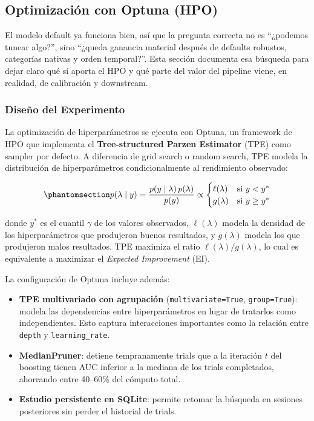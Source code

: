\documentclass[
  spanish,
  11pt,
  letterpaper,
]{scrbook}
\providecommand{\tightlist}{%
  \setlength{\itemsep}{0pt}\setlength{\parskip}{0pt}}
\theoremstyle{plain}
\theoremstyle{remark}
\begin{document}
\subsection{Optimización con Optuna (HPO)}\label{sec-optuna-hpo}

El modelo default ya funciona bien, así que la pregunta correcta no es
``¿podemos tunear algo?'', sino ``¿queda ganancia material después de
defaults robustos, categorías nativas y orden temporal?''. Esta sección
documenta esa búsqueda para dejar claro qué sí aporta el HPO y qué parte
del valor del pipeline viene, en realidad, de calibración y downstream.

\subsubsection{Diseño del Experimento}\label{diseuxf1o-del-experimento}

La optimización de hiperparámetros se ejecuta con Optuna, un framework
de HPO que implementa el \textbf{Tree-structured Parzen Estimator} (TPE)
como sampler por defecto. A diferencia de grid search o random search,
TPE modela la distribución de hiperparámetros condicionalmente al
rendimiento observado:

\begin{equation}\protect\phantomsection\label{eq-tpe}{
p(\lambda \mid y) = \frac{p(y \mid \lambda) \, p(\lambda)}{p(y)} \propto \begin{cases} \ell(\lambda) & \text{si } y < y^* \\ g(\lambda) & \text{si } y \geq y^* \end{cases}
}\end{equation}

donde \(y^*\) es el cuantil \(\gamma\) de los valores observados,
\(\ell(\lambda)\) modela la densidad de los hiperparámetros que
produjeron buenos resultados, y \(g(\lambda)\) modela los que produjeron
malos resultados. TPE maximiza el ratio \(\ell(\lambda)/g(\lambda)\), lo
cual es equivalente a maximizar el \emph{Expected Improvement} (EI).

La configuración de Optuna incluye además:

\begin{itemize}
\tightlist
\item
  \textbf{TPE multivariado con agrupación} (\texttt{multivariate=True},
  \texttt{group=True}): modela las dependencias entre hiperparámetros en
  lugar de tratarlos como independientes. Esto captura interacciones
  importantes como la relación entre \texttt{depth} y
  \texttt{learning\_rate}.
\item
  \textbf{MedianPruner}: detiene tempranamente trials que a la iteración
  \(t\) del boosting tienen AUC inferior a la mediana de los trials
  completados, ahorrando entre 40--60\% del cómputo total.
\item
  \textbf{Estudio persistente en SQLite}: permite retomar la búsqueda en
  sesiones posteriores sin perder el historial de trials.
\end{itemize}
\end{document}
